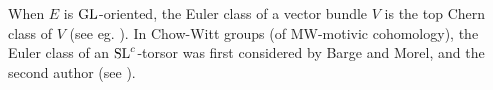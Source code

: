 \begin{rem}
When $E$ is $\mathrm{GL}$-oriented, the Euler class of a vector bundle $V$ is the top Chern class of $V$
(see eg. \cite[Rem. 2.4.5]{Deg12}). In Chow-Witt groups (of MW-motivic cohomology),
the Euler class of an $\mathrm{SL}^c$-torsor was first considered by Barge and Morel, and the second author
(see \cite{Fasel08a}).
\end{rem}

%
%
